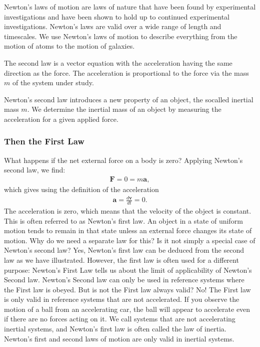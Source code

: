 \documentclass[letterpaper,10pt,english]{sphinxmanual}
\begin{document}
Newton’s laws of motion are laws of nature that have been found by experimental
investigations and have been shown to hold up to continued experimental investigations.
Newton’s laws are valid over a wide range of length\sphinxhyphen{} and time\sphinxhyphen{}scales. We
use Newton’s laws of motion to describe everything from the motion of atoms to the
motion of galaxies.

The second law is a vector equation with the acceleration having the same
direction as the force. The acceleration is proportional to the force via the mass \(m\) of the system under study.

Newton’s second law introduces a new property of an object, the so\sphinxhyphen{}called
inertial mass \(m\). We determine the inertial mass of an object by measuring the
acceleration for a given applied force.


\subsubsection{Then the First Law}
\label{\detokenize{chapter3:then-the-first-law}}
What happens if the net external force on a body is zero? Applying Newton’s second
law, we find:
\begin{equation*}
\begin{split}
\boldsymbol{F} = 0 = m\boldsymbol{a},
\end{split}
\end{equation*}
which gives using the definition of the acceleration
\begin{equation*}
\begin{split}
\boldsymbol{a} = \frac{d\boldsymbol{v}}{dt}=0.
\end{split}
\end{equation*}
The acceleration is zero, which means that the velocity of the object is constant. This
is often referred to as Newton’s first law. An object in a state of uniform motion tends to remain in
that state unless an external force changes its state of motion.
Why do we need a separate law for this? Is it not simply a special case of Newton’s
second law? Yes, Newton’s first law can be deduced from the second law as we have
illustrated. However, the first law is often used for a different purpose: Newton’s
First Law tells us about the limit of applicability of Newton’s Second law. Newton’s
Second law can only be used in reference systems where the First law is obeyed. But
is not the First law always valid? No! The First law is only valid in reference systems
that are not accelerated. If you observe the motion of a ball from an accelerating
car, the ball will appear to accelerate even if there are no forces acting on it. We call
systems that are not accelerating inertial systems, and Newton’s first law is often
called the law of inertia. Newton’s first and second laws of motion are only valid in
inertial systems.
\end{document}
